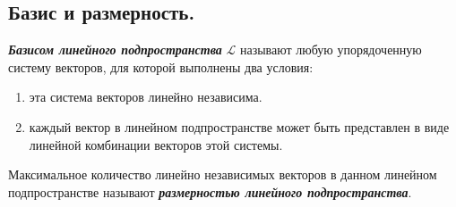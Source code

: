 \subsection{
    Базис и размерность.
}

\begin{definition}
    \textbf{\textit{Базисом линейного подпространства}} $\mathcal{L}$ называют любую упорядоченную систему векторов, для которой выполнены два условия:
    \begin{enumerate}[nosep]
        \item эта система векторов линейно независима.
        \item каждый вектор в линейном подпространстве может быть представлен в виде линейной комбинации векторов этой системы.
    \end{enumerate}
\end{definition}

\begin{definition}
    Максимальное количество линейно независимых векторов в данном линейном подпространстве называют \textbf{\textit{размерностью линейного подпространства}}.
\end{definition}
